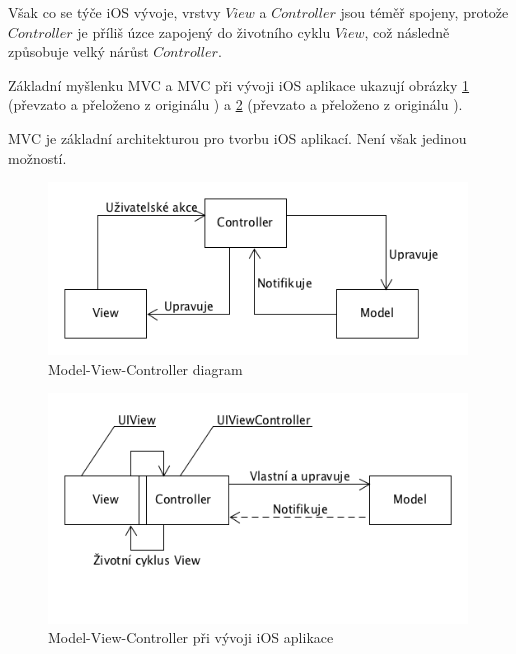 \documentclass[thesis=M,czech]{FITthesis}[2012/06/26]
\begin{document}
Však co se týče iOS vývoje, vrstvy $View$ a $Controller$ jsou téměř spojeny, protože $Controller$ je příliš úzce zapojený do životního cyklu $View$, což následně způsobuje velký nárůst $Controller$.\cite{Orlov}

Základní myšlenku MVC a MVC při vývoji iOS aplikace ukazují obrázky \ref{fig:mvc} (převzato a přeloženo z originálu \cite{mvc-pic}) a \ref{fig:mvc-apple} (převzato a přeloženo z originálu \cite{mvc-apple-pic}).

MVC je základní architekturou pro tvorbu iOS aplikací. Není však jedinou možností.

\begin{figure}[h]\centering
 \includegraphics[width=0.99\textwidth]{./pictures/architektury/model_view_controller}
 \caption[Model-View-Controller diagram]{Model-View-Controller diagram}\label{fig:mvc}
\end{figure}

\begin{figure}[h]\centering
 \includegraphics[width=0.99\textwidth]{./pictures/architektury/appleMVC}
 \caption[Model-View-Controller při vývoji iOS aplikace]{Model-View-Controller při vývoji iOS aplikace}\label{fig:mvc-apple}
\end{figure}
\end{document}
